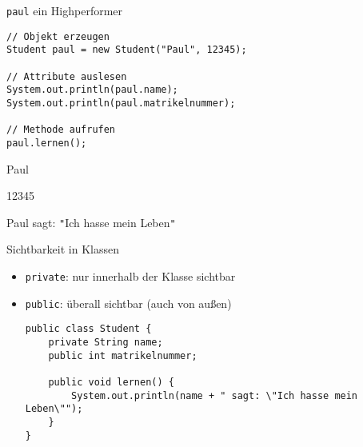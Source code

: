 \documentclass{../../presentation}
\begin{document}
\begin{frame}[fragile]{\texttt{paul} ein Highperformer}
	\begin{verbatim}
// Objekt erzeugen
Student paul = new Student("Paul", 12345);

// Attribute auslesen
System.out.println(paul.name);
System.out.println(paul.matrikelnummer);

// Methode aufrufen
paul.lernen();
\end{verbatim}

	\begin{ausgabe}
		Paul

		12345

		Paul sagt: \texttt{"}Ich hasse mein Leben\texttt{"}
	\end{ausgabe}
\end{frame}



\begin{frame}[fragile]{Sichtbarkeit in Klassen}

\begin{itemize}
	\item<2-> \texttt{private}: nur innerhalb der Klasse sichtbar
	\item<3-> \texttt{public}: überall sichtbar (auch von außen)
	\begin{verbatim}
public class Student {
    private String name;         
    public int matrikelnummer;   

    public void lernen() {
        System.out.println(name + " sagt: \"Ich hasse mein Leben\"");
    }
}
\end{verbatim}
\end{itemize}
\end{frame}
\end{document}
